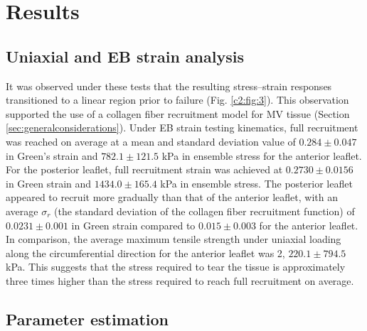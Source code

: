 \section{Results}

\subsection{Uniaxial and EB strain analysis} \label{c2:sec:uniaxialandEBresults}

    It was observed under these tests that the resulting stress–strain responses transitioned to a linear region prior to failure (Fig. \ref{c2:fig:3}). This observation supported the use of a collagen fiber recruitment model for MV tissue (Section \ref{sec:generalconsiderations}). Under EB strain testing kinematics, full recruitment was reached on average at a mean and standard deviation value of $0.284\pm0.047$ in Green’s strain and $782.1\pm121.5$ kPa in ensemble stress for the anterior leaflet. For the posterior leaflet, full recruitment strain was achieved at $0.2730\pm0.0156$ in Green strain and $1434.0\pm165.4$ kPa in ensemble stress. The posterior leaflet appeared to recruit more gradually than that of the anterior leaflet, with an average $\sigma_r$ (the standard deviation of the collagen fiber recruitment function) of $0.0231\pm0.001$ in Green strain compared to $0.015\pm0.003$ for the anterior leaflet. In comparison, the average maximum tensile strength under uniaxial loading along the circumferential direction for the anterior leaflet was 2, $220.1\pm794.5$ kPa. This suggests that the stress required to tear the tissue is approximately three times higher than the stress required to reach full recruitment on average.
    

\subsection{Parameter estimation}


